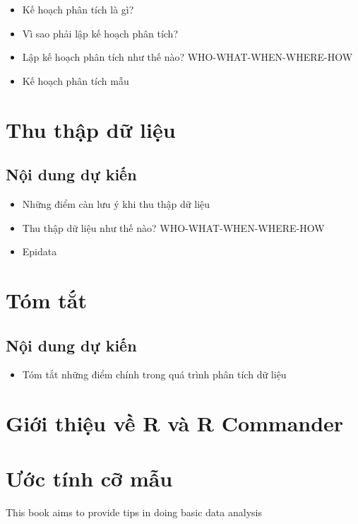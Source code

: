 \documentclass[]{tufte-book}
\providecommand{\tightlist}{%
  \setlength{\itemsep}{0pt}\setlength{\parskip}{0pt}}
\begin{document}
\begin{itemize}
\tightlist
\item
  Kế hoạch phân tích là gì?
\item
  Vì sao phải lập kế hoạch phân tích?
\item
  Lập kế hoạch phân tích như thế nào? WHO-WHAT-WHEN-WHERE-HOW
\item
  Kế hoạch phân tích mẫu
\end{itemize}

\hypertarget{thu-thp-d-liu}{%
\chapter{Thu thập dữ liệu}\label{thu-thp-d-liu}}

\hypertarget{ni-dung-d-kin-5}{%
\section{Nội dung dự kiến}\label{ni-dung-d-kin-5}}

\begin{itemize}
\tightlist
\item
  Những điểm càn lưu ý khi thu thập dữ liệu
\item
  Thu thập dữ liệu như thế nào? WHO-WHAT-WHEN-WHERE-HOW
\item
  Epidata
\end{itemize}

\hypertarget{tom-tt}{%
\chapter{Tóm tắt}\label{tom-tt}}

\hypertarget{ni-dung-d-kin-6}{%
\section{Nội dung dự kiến}\label{ni-dung-d-kin-6}}

\begin{itemize}
\tightlist
\item
  Tóm tắt những điểm chính trong quá trình phân tích dữ liệu
\end{itemize}

\hypertarget{Rcmdr}{%
\chapter{Giới thiệu về R và R Commander}\label{Rcmdr}}

\hypertarget{uc-tinh-c-mu}{%
\chapter*{Ước tính cỡ mẫu}\label{uc-tinh-c-mu}}

This book aims to provide tips in doing basic data analysis


\end{document}
